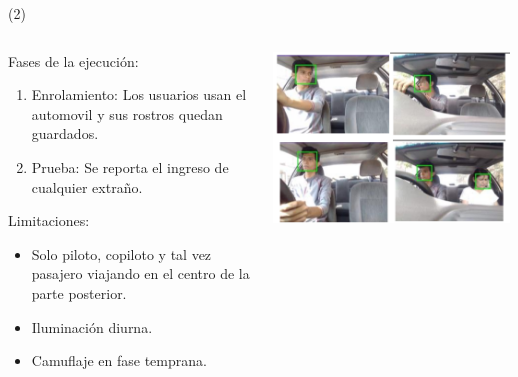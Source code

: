 \begin{frame}{ (2)}
\begin{columns}
\begin{column}{0.55\textwidth}
Fases de la ejecución:
	\begin{enumerate}
\item Enrolamiento: Los usuarios usan el automovil y sus rostros quedan guardados.
\item Prueba: Se reporta el ingreso de cualquier extraño.
	\end{enumerate}
Limitaciones:
	\begin{itemize}
\item Solo piloto, copiloto y tal vez pasajero viajando en el centro de la parte posterior.
\item Iluminación diurna.
\item Camuflaje en fase temprana.
	\end{itemize}

\end{column}
\begin{column}{0.45\textwidth}
\begin{center}
     \includegraphics[width=0.99\textwidth]{Figs/ConductorAutorizado1}
     \end{center}
\end{column}

\end{columns}
\end{frame}


